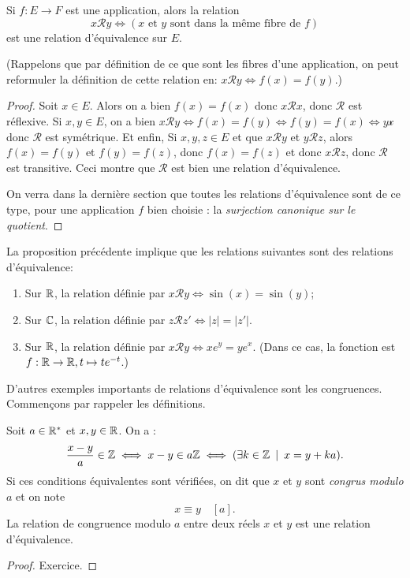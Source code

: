 \begin{proposition}
Si $f : E\to F$ est une application, alors la relation 
\[
x\mathcal R y \iff (x\text{ et }y \text{ sont dans la même fibre de }f)
\]
est une relation d'équivalence sur $E$.

(Rappelons que par définition de ce que sont les fibres d'une application, on peut reformuler la définition de cette relation en: $x\mathcal R y \iff f(x)=f(y)$.)
\end{proposition}
\begin{proof}
Soit $x \in E$. Alors on a bien $f(x)=f(x)$ donc $x\mathcal R x$, donc $\mathcal R$ est réflexive. Si $x, y\in E$, on a bien $x\mathcal R y \iff f(x)=f(y) \iff f(y)=f(x) \iff y\mathcal x$ donc $\mathcal R$ est symétrique. Et enfin, Si $x,y,z\in E$ et que $x\mathcal R y$ et $y\mathcal R z$, alors $f(x)=f(y)$ et $f(y)=f(z)$, donc $f(x)=f(z)$ et donc $x\mathcal R z$, donc $\mathcal R$ est transitive. Ceci montre que $\mathcal R$ est bien une relation d'équivalence.

On verra dans la dernière section que toutes les relations d'équivalence sont de ce type, pour une application $f$ bien choisie : la \emph{surjection canonique sur le quotient}.
\end{proof}

\begin{exemple} La proposition précédente implique que les relations suivantes sont des relations d'équivalence:
\begin{enumerate}
\item Sur $\mathbb{R}$, la relation définie par $x\mathcal R y \iff \sin(x)=\sin(y)$;
\item Sur $\mathbb{C}$, la relation définie par $z\mathcal R z' \iff |z|=|z'|$.
\item Sur $\mathbb{R}$, la relation définie par $x\mathcal R y \iff xe^y=ye^x$. (Dans ce cas, la fonction est $f :\mathbb{R}\to \mathbb{R}, t\mapsto te^{-t}$.)
\end{enumerate}
\end{exemple}

D'autres exemples importants de relations d'équivalence sont les congruences. Commençons par rappeler les définitions.

\begin{propdef}
Soit $a\in \mathbb{R}^*$ et $x,y\in\mathbb{R}$. On a :
\[
\frac{x-y}{a}\in \mathbb{Z} 
\iff
x-y \in a\mathbb{Z}
\iff 
(\exists k\in \mathbb{Z}\:\mid\: x=y+ka).
\]
Si ces conditions équivalentes sont vérifiées, on dit que $x$ et $y$ sont \emph{congrus modulo $a$} et on note 
\[ x\equiv y\quad [a].\]
La relation de congruence modulo $a$ entre deux réels $x$ et $y$ est une relation d'équivalence.
\end{propdef}
\begin{proof}
Exercice.
\end{proof}

